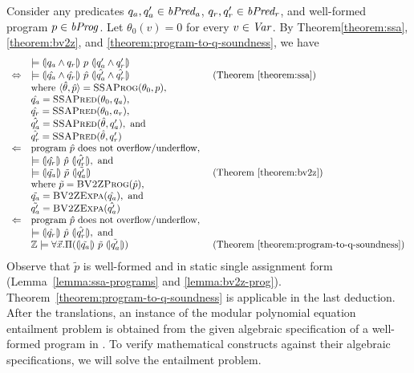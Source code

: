 
Consider any predicates $q_a, q_a' \in \mathit{bPred_a}$, $q_r, q_r' \in \mathit{bPred_r}$, and well-formed program $p \in
\mathit{bProg}$. Let $\theta_0 (v) = 0$ for every $v \in \mathit{Var}$. By
Theorem\ref{theorem:ssa}, \ref{theorem:bv2z}, and \ref{theorem:program-to-q-soundness}, we have
\begin{equation*}
  \begin{array}{cll}
    & \models \hoaretriple{q_a \wedge q_r}{p}{q_a' \wedge q_r'}\\
    \Leftrightarrow
    & \models
      \hoaretriple{\hat{q_a} \wedge \hat{q_r}}
      {\hat{p}}
      {\hat{q_a'} \wedge \hat{q_r'}}
    & \textmd{ (Theorem~\ref{theorem:ssa})}\\
    &
      \textmd{where } \langle \hat{\theta}, \hat{p} \rangle =
      \textsc{SSAProg} (\theta_0, p), \\
    & \hat{q_a} = \textsc{SSAPred}(\theta_0, q_a), \\
    & \hat{q_r} = \textsc{SSAPred}(\theta_0, a_r), \\
    & \hat{q_a'} = \textsc{SSAPred}(\hat{\theta}, q_a'), \textmd{ and} \\
    & \hat{q_r'} = \textsc{SSAPred}(\hat{\theta}, q_r') \\
    \Leftarrow
    & \textmd{program $\hat{p}$ does not overflow/underflow}, \\
    & \models \hoaretriple{\hat{q_r}}{\hat{p}}{\hat{q_r'}}, \textmd{ and } \\
    & \models \hoaretriple{\tilde{q_a}}{\tilde{p}}{\tilde{q_a'}}
    & \textmd{ (Theorem~\ref{theorem:bv2z})} \\
    & \textmd{where } \tilde{p} = \textsc{BV2ZProg}(\hat{p}), \\
    & \tilde{q_a} = \textsc{BV2ZExpa}(\hat{q_a}), \textmd{ and} \\
    & \tilde{q_a'} = \textsc{BV2ZExpa}(\hat{q_a'}) \\
    \Leftarrow
    & \textmd{program $\hat{p}$ does not overflow/underflow}, \\
    & \models \hoaretriple{\hat{q_r}}{\hat{p}}{\hat{q_r'}}, \textmd{ and } \\
    & \bbfZ \models \forall \vx.
      \Pi (\hoaretriple{\tilde{q_a}}{\tilde{p}}{\tilde{q_a'}})
    & \textmd{ (Theorem~\ref{theorem:program-to-q-soundness})}
  \end{array}
\end{equation*}
Observe that $\tilde{p}$ is well-formed and in static single assignment
form (Lemma~\ref{lemma:ssa-programs} and \ref{lemma:bv2z-prog}).
Theorem~\ref{theorem:program-to-q-soundness} is applicable in the last
deduction. After the translations, an instance of the modular
polynomial equation entailment problem is obtained from the given
algebraic specification of a well-formed program in \bvdsl.
To verify mathematical constructs against their algebraic
specifications, we will solve the entailment problem.